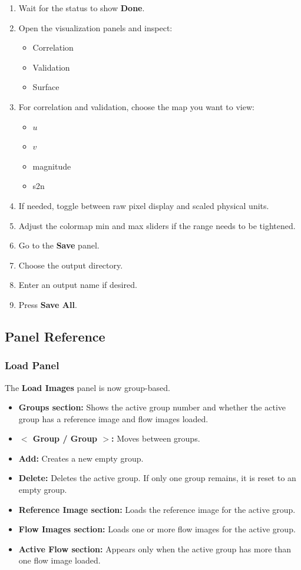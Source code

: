 \documentclass[11pt]{article}
\begin{document}
\begin{enumerate}
    \item Wait for the status to show \textbf{Done}.
    \item Open the visualization panels and inspect:
    \begin{itemize}
        \item Correlation
        \item Validation
        \item Surface
    \end{itemize}
    \item For correlation and validation, choose the map you want to view:
    \begin{itemize}
        \item $u$
        \item $v$
        \item magnitude
        \item s2n
    \end{itemize}
    \item If needed, toggle between raw pixel display and scaled physical units.
    \item Adjust the colormap min and max sliders if the range needs to be tightened.
    \item Go to the \textbf{Save} panel.
    \item Choose the output directory.
    \item Enter an output name if desired.
    \item Press \textbf{Save All}.
\end{enumerate}

\subsection{Panel Reference}

\subsubsection{Load Panel}

The \textbf{Load Images} panel is now group-based.

\begin{itemize}
    \item \textbf{Groups section:} Shows the active group number and whether the active group has a reference image and flow images loaded.
    \item \textbf{$<$ Group / Group $>$:} Moves between groups.
    \item \textbf{Add:} Creates a new empty group.
    \item \textbf{Delete:} Deletes the active group. If only one group remains, it is reset to an empty group.
    \item \textbf{Reference Image section:} Loads the reference image for the active group.
    \item \textbf{Flow Images section:} Loads one or more flow images for the active group.
    \item \textbf{Active Flow section:} Appears only when the active group has more than one flow image loaded.
\end{itemize}
\end{document}
